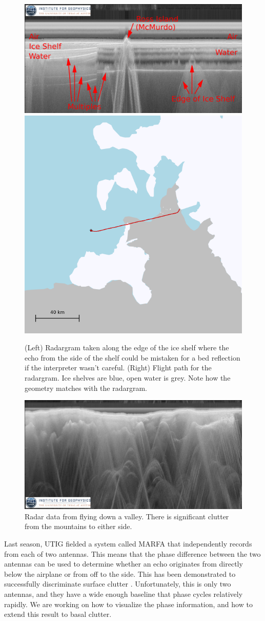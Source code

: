 \documentclass[11pt]{article}
\begin{document}
\begin{figure}[ht!]
\centering
\includegraphics[width=0.6\columnwidth]{figures/MIS_JKB2e_Y25a_full.png}
\includegraphics[width=0.3\columnwidth]{figures/MIS_JKB2e_Y25a_0.png}
\caption[]{(Left) Radargram taken along the edge of the ice shelf where the echo from the side of the shelf could be mistaken for a bed reflection if the interpreter wasn't careful. (Right) Flight path for the radargram. Ice shelves are blue, open water is grey. Note how the geometry matches with the radargram.}
\label{fig:off_nadir_ice_shelf}
\end{figure}

\begin{figure}[ht!]
\centering
\includegraphics[width=0.8\columnwidth]{figures/ICP2_JKB1a_F09T01a_full.png}
\caption[]{Radar data from flying down a valley. There is significant clutter from the mountains to either side.}
\label{fig:off_nadir_mountains}
\end{figure}

Last season, UTIG fielded a system called MARFA that independently records from each of two antennas. 
This means that the phase difference between the two antennas can be used to determine whether an echo originates from directly below the airplane or from off to the side.
This has been demonstrated to successfully discriminate surface clutter \cite{Castelletti2015}.
Unfortunately, this is only two antennas, and they have a wide enough baseline that phase cycles relatively rapidly. 
We are working on how to visualize the phase information, and how to extend this result to basal clutter.
\end{document}
